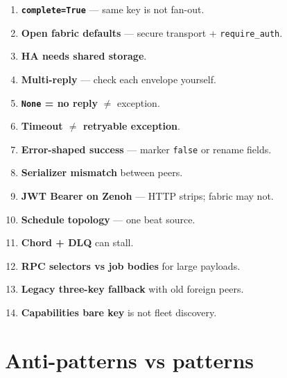 \documentclass[11pt,a4paper]{article}
\begin{document}
\begin{enumerate}[leftmargin=*,itemsep=3pt]
  \item \textbf{\texttt{complete=True}} --- same key is not fan-out.
  \item \textbf{Open fabric defaults} --- secure transport + \texttt{require\_auth}.
  \item \textbf{HA needs shared storage}.
  \item \textbf{Multi-reply} --- check each envelope yourself.
  \item \textbf{\texttt{None} = no reply} $\neq$ exception.
  \item \textbf{Timeout $\neq$ retryable exception}.
  \item \textbf{Error-shaped success} --- marker \texttt{false} or rename fields.
  \item \textbf{Serializer mismatch} between peers.
  \item \textbf{JWT Bearer on Zenoh} --- HTTP strips; fabric may not.
  \item \textbf{Schedule topology} --- one beat source.
  \item \textbf{Chord + DLQ} can stall.
  \item \textbf{RPC selectors vs job bodies} for large payloads.
  \item \textbf{Legacy three-key fallback} with old foreign peers.
  \item \textbf{Capabilities bare key} is not fleet discovery.
\end{enumerate}

\section{Anti-patterns vs patterns}
\end{document}

